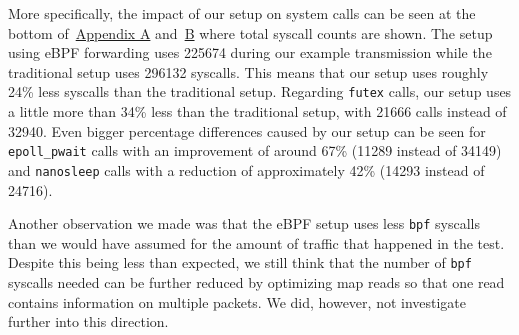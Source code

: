 More specifically, the impact of our setup on system calls can be seen at the bottom 
of~\hyperref[chap:appendix-fast-relay]{Appendix A} and~\hyperref[chap:appendix-plain-relay]{B} 
where total syscall counts are shown.
The setup using eBPF forwarding uses 225674 during our example transmission while the traditional setup 
uses 296132 syscalls.
This means that our setup uses roughly 24\% less syscalls than the traditional setup.
Regarding \verb|futex| calls, our setup uses a little more than 34\% less than the 
traditional setup, with 21666 calls instead of 32940.
Even bigger percentage differences caused by our setup can be seen for \verb|epoll_pwait| calls with 
an improvement of around 67\% (11289 instead of 34149) and \verb|nanosleep| calls with a reduction of 
approximately 42\% (14293 instead of 24716).

Another observation we made was that the eBPF setup uses less \verb|bpf| syscalls than we would have assumed for 
the amount of traffic that happened in the test.
Despite this being less than expected, we still think that the number of \verb|bpf| syscalls needed can be 
further reduced by optimizing map reads so that one read contains information on multiple packets.
We did, however, not investigate further into this direction.